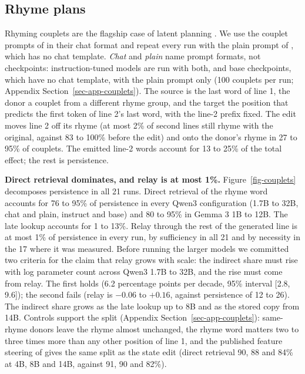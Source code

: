 \documentclass[
]{article}
\begin{document}
\subsection{Rhyme plans}\label{sec-couplets}

Rhyming couplets are the flagship case of latent planning
\citep{lindsey2025biology, hanna2026latent}. We use the couplet prompts
of \citet{hanna2026latent} in their chat format and repeat every run
with the plain prompt of \citet{ma2026plan}, which has no chat template.
\emph{Chat} and \emph{plain} name prompt formats, not checkpoints:
instruction-tuned models are run with both, and base checkpoints, which
have no chat template, with the plain prompt only (100 couplets per run;
Appendix Section~\ref{sec-app-couplets}). The source is the last word of
line 1, the donor a couplet from a different rhyme group, and the target
the position that predicts the first token of line 2's last word, with
the line-2 prefix fixed. The edit moves line 2 off its rhyme (at most
2\% of second lines still rhyme with the original, against 83 to 100\%
before the edit) and onto the donor's rhyme in 27 to 95\% of couplets.
The emitted line-2 words account for 13 to 25\% of the total effect; the
rest is persistence.

\textbf{Direct retrieval dominates, and relay is at most 1\%.}
Figure~\ref{fig-couplets} decomposes persistence in all 21 runs. Direct
retrieval of the rhyme word accounts for 76 to 95\% of persistence in
every Qwen3 configuration (1.7B to 32B, chat and plain, instruct and
base) and 80 to 95\% in Gemma 3 1B to 12B. The late lookup accounts for
1 to 13\%. Relay through the rest of the generated line is at most 1\%
of persistence in every run, by sufficiency in all 21 and by necessity
in the 17 where it was measured. Before running the larger models we
committed two criteria for the claim that relay grows with scale: the
indirect share must rise with log parameter count across Qwen3 1.7B to
32B, and the rise must come from relay. The first holds (6.2 percentage
points per decade, 95\% interval {[}2.8, 9.6{]}); the second fails
(relay is \(-0.06\) to \(+0.16\), against persistence of 12 to 26). The
indirect share grows as the late lookup up to 8B and as the stored copy
from 14B. Controls support the split (Appendix
Section~\ref{sec-app-couplets}): same-rhyme donors leave the rhyme
almost unchanged, the rhyme word matters two to three times more than
any other position of line 1, and the published feature steering of
\citet{hanna2026latent} gives the same split as the state edit (direct
retrieval 90, 88 and 84\% at 4B, 8B and 14B, against 91, 90 and 82\%).
\end{document}
